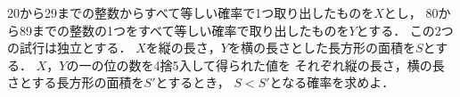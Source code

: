\documentclass[../../main.tex]{subfiles}
\begin{document}
20から29までの整数からすべて等しい確率で1つ取り出したものを$X$とし，
80から89までの整数の1つをすべて等しい確率で取り出したものを$Y$とする．
この2つの試行は独立とする．
$X$を縦の長さ，$Y$を横の長さとした長方形の面積を$S$とする．
$X$，$Y$の一の位の数を4捨5入して得られた値を
それぞれ縦の長さ，横の長さとする長方形の面積を$S'$とするとき，
$S<S'$となる確率を求めよ．
\end{document}
